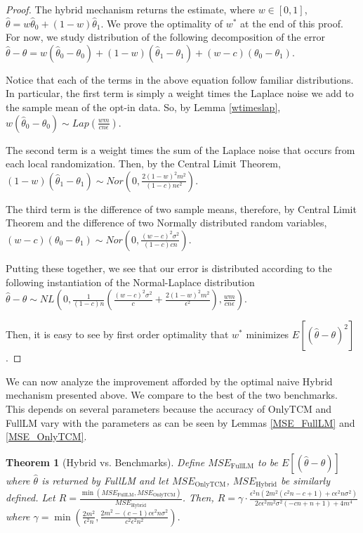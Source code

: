 \documentclass{article}
\theoremstyle{plain}
\newtheorem{thm}{Theorem}[section]
\begin{document}
\begin{proof}
The hybrid mechanism returns the estimate, where $w \in [0,1]$,
$\hat{\theta} = w\hat{\theta}_0 + (1-w)\hat{\theta}_1.$
We prove the optimality of $w^*$ at the end of this proof. For now, we study distribution of the following decomposition of the error
$\hat{\theta} - \theta = w(\hat{\theta}_0 - \theta_0) + (1-w)(\hat{\theta}_1 - \theta_1) + (w-c)(\theta_0 - \theta_1).$

Notice that each of the terms in the above equation follow familiar distributions. In particular, the first term is simply a weight times the Laplace noise we add to the sample mean of the opt-in data. So, by Lemma \ref{wtimeslap},
$w(\hat{\theta}_0 - \theta_0) \sim Lap\left(\frac{wm}{cn\epsilon}\right).$

The second term is a weight times the sum of the Laplace noise that occurs from each local randomization. Then, by the Central Limit Theorem,
$(1-w)(\hat{\theta}_1 - \theta_1) \sim Nor\left(0, \frac{2(1-w)^2 m^2}{(1-c)n\epsilon^2}\right).$

The third term is the difference of two sample means, therefore, by Central Limit Theorem and the difference of two Normally distributed random variables, 
$(w-c)(\theta_0 - \theta_1) \sim Nor\left(0, \frac{(w-c)^2\sigma^2}{(1-c)cn}\right).$

Putting these together, we see that our error is distributed according to the following instantiation of the Normal-Laplace distribution
$\hat{\theta} - \theta \sim NL\left(0, \frac{1}{(1-c)n}\left(\frac{(w-c)^2\sigma^2}{c} + \frac{2(1-w)^2 m^2}{\epsilon^2}\right), \frac{wm}{cn\epsilon}\right).$

Then, it is easy to see by first order optimality that $w^*$ minimizes $E[(\hat{\theta} - \theta)^2]$.
\end{proof}

We can now analyze the improvement afforded by the optimal naive Hybrid mechanism presented above. We compare to the best of the two benchmarks. This depends on several parameters because the accuracy of OnlyTCM and FullLM vary with the parameters as can be seen by Lemmas \ref{MSE_FullLM} and \ref{MSE_OnlyTCM}. 

\begin{thm}[Hybrid vs. Benchmarks]
Define $MSE_{\text{FullLM}}$ to be $E[(\hat{\theta} - \theta)]$ where $\hat{\theta}$ is returned by FullLM and let $MSE_{\text{OnlyTCM}}$, $MSE_{\text{Hybrid}}$ be similarly defined.
Let 
$R = \frac{\min(MSE_{\text{FullLM}}, MSE_{\text{OnlyTCM}})}{MSE_{\text{Hybrid}}}$.
Then, 
$R = \gamma \cdot \frac{\epsilon^2 n \left(2 m^2 \left(c^2 n-c+1\right)+c \epsilon^2 n \sigma^2\right)}{2 c \epsilon^2 m^2 \sigma^2 (-c n+n+1)+4 m^4}$
where 
$\gamma = \min \left(\frac{2 m^2}{\epsilon^2 n},\frac{2 m^2-(c-1) c \epsilon^2 n \sigma^2}{c^2 \epsilon^2 n^2}\right).$
\end{thm}
\end{document}
